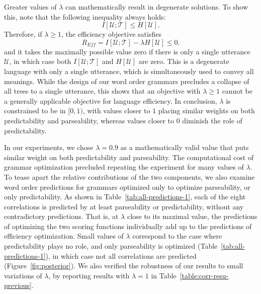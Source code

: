 \documentclass[10pt,twoside,lineno]{article}
\newcommand{\utterance}{\mathcal{U}}
\newcommand{\tree}{\mathcal{T}}
\begin{document}
Greater values of $\lambda$ can mathematically result in degenerate solutions.
To show this, note that the following inequality always holds:
\begin{equation}
I[\utterance; \tree] \leq H[\utterance].
\end{equation}
Therefore, if $\lambda \geq 1$, the efficiency objective satisfies 
\begin{equation}
    R_{Eff} = I[\utterance; \tree] - \lambda H[\utterance] \leq 0.
\end{equation}
and it takes the maximally possible value zero if there is only a single utterance $\utterance$, in which case both $I[\utterance; \tree]$ and $H[\utterance]$ are zero.
This is a degenerate language with only a single utterance, which is simultaneously used to convey all meanings.
While the design of our word order grammars precludes a collapse of all trees to a single utterance, this shows that an objective with $\lambda \geq 1$ cannot be a generally applicable objective for language efficiency.
In conclusion, $\lambda$ is constrained to be in $[0,1)$, with values closer to $1$ placing similar weights on both predictability and parseability, whereas values closer to $0$ diminish the role of predictability.

In our experiments, we chose $\lambda = 0.9$ as a mathematically valid value that puts similar weight on both predictability and parseability.
The computational cost of grammar optimization precluded repeating the experiment for many values of $\lambda$.
To tease apart the relative contributions of the two components, we also examine word order predictions for grammars optimized only to optimize parseability, or only predictability.
As shown in Table~\ref{tab:all-predictions-1}, each of the eight correlations is predicted by at least parseability or predictability, without any contradictory predictions.
That is, at $\lambda$ close to its maximal value, the predictions of optimizing the two scoring functions individually add up to the predictions of efficiency optimization.
Small values of $\lambda$ correspond to the case where predictability plays no role, and only parseability is optimized (Table~\ref{tab:all-predictions-1}), in which case not all correlations are predicted (Figure~\ref{fig:posterior}).
We also verified the robustness of our results to small variations of $\lambda$, by reporting results with $\lambda=1$ in Table~\ref{table:corr-resu-previous}.
\end{document}

